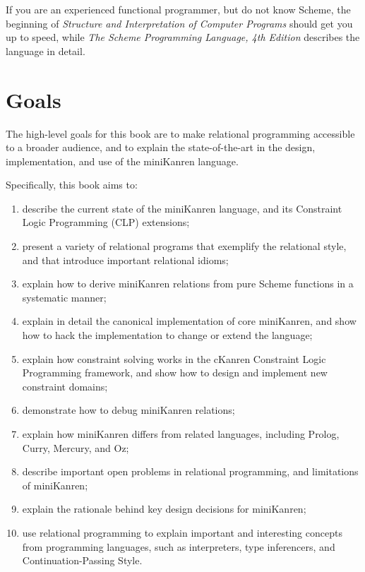 If you are an experienced functional programmer, but do not know
Scheme, the beginning of \emph{Structure and Interpretation of
  Computer Programs} should get you up to speed, while \emph{The
  Scheme Programming Language, 4th Edition}\cite{Dybvig:2009:SPL:1618542} describes the language in detail.


\section{Goals}\label{sec:preface:goals}


The high-level goals for this book are to make relational programming
accessible to a broader audience, and to explain the state-of-the-art
in the design, implementation, and use of the miniKanren language.

Specifically, this book aims to:

\begin{enumerate}
\item describe the current state of the miniKanren language, and
  its Constraint Logic Programming (CLP) extensions;
\item present a variety of relational programs that exemplify the
  relational style, and that introduce important relational idioms;
\item explain how to derive miniKanren relations from pure Scheme
  functions in a systematic manner;
\item explain in detail the canonical implementation of core miniKanren,
  and show how to hack the implementation to change or extend the
  language;
\item explain how constraint solving works in the cKanren
  Constraint Logic Programming framework, and show how to design and
  implement new constraint domains;
\item demonstrate how to debug miniKanren relations;
\item explain how miniKanren differs from related languages,
  including Prolog, Curry, Mercury, and Oz;
\item describe important open problems in relational programming, and
  limitations of miniKanren;
\item explain the rationale behind key design decisions for miniKanren;
\item use relational programming to explain important and interesting
  concepts from programming languages, such as interpreters, type
  inferencers, and Continuation-Passing Style.
\end{enumerate}

